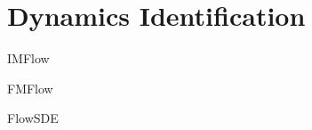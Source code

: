 \section{Dynamics Identification}
\label{sec:methods:dynamics_identification}

IMFlow

FMFlow

FlowSDE
